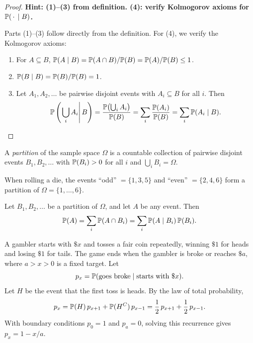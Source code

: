 \documentclass[a4paper]{article}
\begin{document}
\begin{proof}
  \textbf{Hint: (1)--(3) from definition. (4): verify Kolmogorov axioms for $\P(\ph \mid B)$.}

  Parts (1)--(3) follow directly from the definition. For (4), we verify the Kolmogorov axioms:
  \begin{enumerate}
    \item For $A\subseteq B$, $\P(A\mid B) = \P(A\cap B)/\P(B) = \P(A)/\P(B) \leq 1$.
    \item $\P(B\mid B) = \P(B)/\P(B) = 1$.
    \item Let $A_1, A_2, \dotsc$ be pairwise disjoint events with $A_i \subseteq B$ for all $i$. Then
      \[
        \P\left(\left.\bigcup_i A_i\right\vert B\right) = \frac{\P\bigl(\bigcup_i A_i\bigr)}{\P(B)} = \sum_i \frac{\P(A_i)}{\P(B)} = \sum_i \P(A_i \mid B).\qedhere
      \]
  \end{enumerate}
\end{proof}

\begin{defi}[Partition]
  A \emph{partition} of the sample space $\Omega$ is a countable collection of pairwise disjoint events $B_1, B_2, \dotsc$ with $\P(B_i) > 0$ for all $i$ and $\bigcup_i B_i = \Omega$.
\end{defi}

\begin{eg}
  When rolling a die, the events ``odd'' $= \{1,3,5\}$ and ``even'' $= \{2,4,6\}$ form a partition of $\Omega = \{1, \dotsc, 6\}$.
\end{eg}

\begin{prop}
  Let $B_1, B_2, \dotsc$ be a partition of $\Omega$, and let $A$ be any event. Then
  \[
    \P(A) = \sum_{i} \P(A\cap B_i) = \sum_{i} \P(A\mid B_i)\, \P(B_i).
  \]
\end{prop}

\begin{eg}
  A gambler starts with $\$x$ and tosses a fair coin repeatedly, winning $\$1$ for heads and losing $\$1$ for tails. The game ends when the gambler is broke or reaches $\$a$, where $a > x > 0$ is a fixed target. Let
  \[
    p_x = \P(\text{goes broke}\mid \text{starts with }\$x).
  \]
  Let $H$ be the event that the first toss is heads. By the law of total probability,
  \[
    p_x = \P(H)\,p_{x + 1} + \P(H^C)\, p_{x - 1} = \frac{1}{2}\,p_{x + 1} + \frac{1}{2}\,p_{x - 1}.
  \]
  With boundary conditions $p_0 = 1$ and $p_a = 0$, solving this recurrence gives $p_x = 1 - x/a$.
\end{eg}
\end{document}
